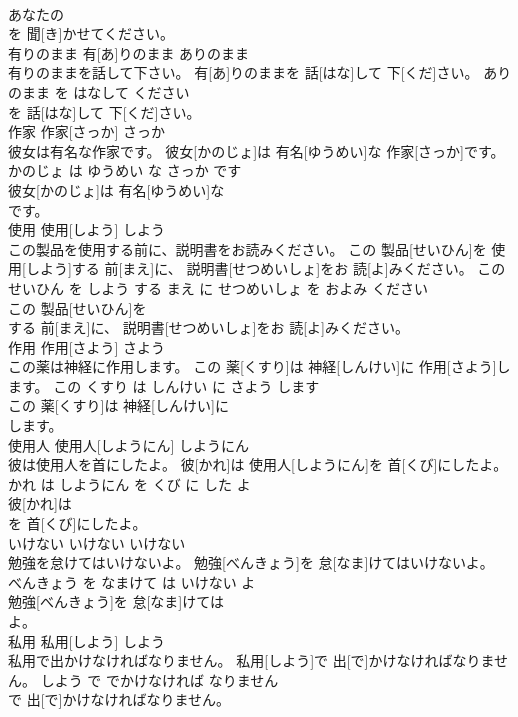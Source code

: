 \documentclass[8pt]{extreport}
\begin{document}
\begin{CJK}{UTF8}{min}
\\	あなたの
\\	を 聞[き]かせてください。			
\\	有りのまま	有[あ]りのまま	ありのまま	
\\	有りのままを話して下さい。	有[あ]りのままを 話[はな]して 下[くだ]さい。	ありのまま を はなして ください	
\\	を 話[はな]して 下[くだ]さい。			
\\	作家	作家[さっか]	さっか	
\\	彼女は有名な作家です。	彼女[かのじょ]は 有名[ゆうめい]な 作家[さっか]です。	かのじょ は ゆうめい な さっか です	
\\	彼女[かのじょ]は 有名[ゆうめい]な
\\	です。			
\\	使用	使用[しよう]	しよう	
\\	この製品を使用する前に、説明書をお読みください。	この 製品[せいひん]を 使用[しよう]する 前[まえ]に、 説明書[せつめいしょ]をお 読[よ]みください。	この せいひん を しよう する まえ に せつめいしょ を およみ ください	
\\	この 製品[せいひん]を
\\	する 前[まえ]に、 説明書[せつめいしょ]をお 読[よ]みください。			
\\	作用	作用[さよう]	さよう	
\\	この薬は神経に作用します。	この 薬[くすり]は 神経[しんけい]に 作用[さよう]します。	この くすり は しんけい に さよう します	
\\	この 薬[くすり]は 神経[しんけい]に
\\	します。			
\\	使用人	使用人[しようにん]	しようにん	
\\	彼は使用人を首にしたよ。	彼[かれ]は 使用人[しようにん]を 首[くび]にしたよ。	かれ は しようにん を くび に した よ	
\\	彼[かれ]は
\\	を 首[くび]にしたよ。			
\\	いけない	いけない	いけない	
\\	勉強を怠けてはいけないよ。	勉強[べんきょう]を 怠[なま]けてはいけないよ。	べんきょう を なまけて は いけない よ	
\\	勉強[べんきょう]を 怠[なま]けては
\\	よ。			
\\	私用	私用[しよう]	しよう	
\\	私用で出かけなければなりません。	私用[しよう]で 出[で]かけなければなりません。	しよう で でかけなければ なりません	
\\	で 出[で]かけなければなりません。			

\end{CJK}
\end{document}
